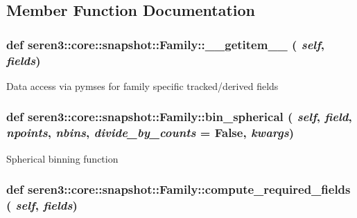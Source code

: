 \subsection{Member Function Documentation}
\hypertarget{classseren3_1_1core_1_1snapshot_1_1Family_aa0a6916f98c20a9a720d4c2bdf7a5272}{
\subsubsection[{\_\-\_\-getitem\_\-\_\-}]{\setlength{\rightskip}{0pt plus 5cm}def seren3::core::snapshot::Family::\_\-\_\-getitem\_\-\_\- ( {\em self}, \/   {\em fields})}}
\label{classseren3_1_1core_1_1snapshot_1_1Family_aa0a6916f98c20a9a720d4c2bdf7a5272}
\begin{DoxyVerb}
Data access via pymses for family specific tracked/derived fields
\end{DoxyVerb}
 \hypertarget{classseren3_1_1core_1_1snapshot_1_1Family_a415a979621358df55ef58f0497014efe}{
\subsubsection[{bin\_\-spherical}]{\setlength{\rightskip}{0pt plus 5cm}def seren3::core::snapshot::Family::bin\_\-spherical ( {\em self}, \/   {\em field}, \/   {\em npoints}, \/   {\em nbins}, \/   {\em divide\_\-by\_\-counts} = {\ttfamily False}, \/   {\em kwargs})}}
\label{classseren3_1_1core_1_1snapshot_1_1Family_a415a979621358df55ef58f0497014efe}
\begin{DoxyVerb}
Spherical binning function
\end{DoxyVerb}
 \hypertarget{classseren3_1_1core_1_1snapshot_1_1Family_a33fdf6f8b0e71125dbbd80567a386d54}{
\subsubsection[{compute\_\-required\_\-fields}]{\setlength{\rightskip}{0pt plus 5cm}def seren3::core::snapshot::Family::compute\_\-required\_\-fields ( {\em self}, \/   {\em fields})}}
